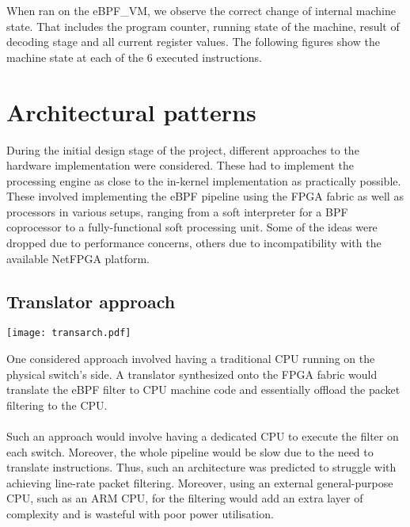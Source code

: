 \documentclass{l4proj}
\begin{document}
When ran on the eBPF\_VM, we observe the correct change of internal machine state. That includes the program counter, running state of the machine, result of decoding stage and all current register values. The following figures show the machine state at each of the 6 executed instructions.\\
\begin{figure}[H]
  \centering
\end{figure}
\begin{figure}[H]
  \centering
\end{figure}

\section{Architectural patterns}
During the initial design stage of the project, different approaches to the hardware implementation were considered. These had to implement the processing engine as close to the in-kernel implementation as practically possible.\\
These involved implementing the eBPF pipeline using the FPGA fabric as well as processors in various setups, ranging from a soft interpreter for a BPF coprocessor to a fully-functional soft processing unit. Some of the ideas were dropped due to performance concerns, others due to incompatibility with the available NetFPGA platform.
\subsection{Translator approach}
\begin{center}
\texttt{[image: transarch.pdf]}\\
\end{center}
One considered approach involved having a traditional CPU running on the physical switch's side. A translator synthesized onto the FPGA fabric would translate the eBPF filter to CPU machine code and essentially offload the packet filtering to the CPU.\\\\
Such an approach would involve having a dedicated CPU to execute the filter on each switch. Moreover, the whole pipeline would be slow due to the need to translate instructions. Thus, such an architecture was predicted to struggle with achieving line-rate packet filtering. Moreover, using an external general-purpose CPU, such as an ARM CPU, for the filtering would add an extra layer of complexity and is wasteful with poor power utilisation.
\end{document}
